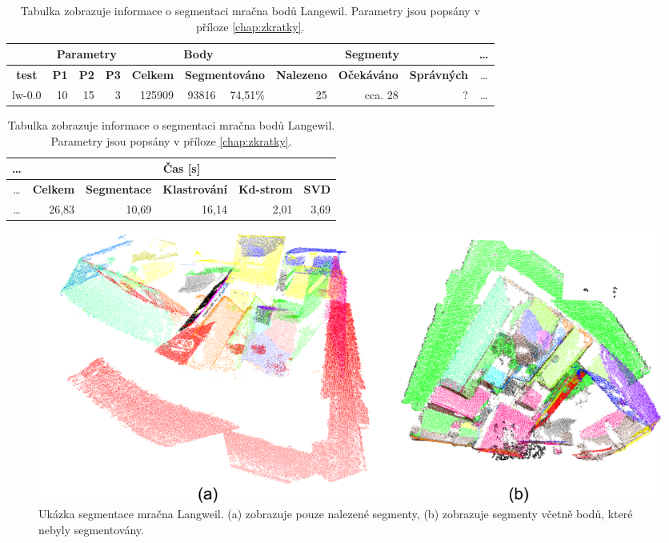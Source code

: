 \documentclass[11pt,twoside,a4paper]{book}
\begin{document}
\begin{table}[ht]
\resizebox{\textwidth}{!} {
\begin{tabular}{|r|r|r|r|r|r|r|r|r|r|c|}
\hline
\textbf{} & \multicolumn{ 3}{c|}{\textbf{Parametry}} & \multicolumn{ 3}{c|}{\textbf{Body}} & \multicolumn{ 3}{c|}{\textbf{Segmenty}} & \ldots\\ \hline
\multicolumn{1}{|c|}{\textbf{test}} & \textbf{P1} & \multicolumn{1}{c|}{\textbf{P2}} & \multicolumn{1}{c|}{\textbf{P3}} & \textbf{Celkem} & \multicolumn{ 2}{c|}{\textbf{Segmentováno}} & \textbf{Nalezeno} & \multicolumn{1}{c|}{\textbf{Očekáváno }} & \multicolumn{1}{c|}{\textbf{Správných}} & \ldots\\ \hline
lw-0.0 & \multicolumn{1}{r|}{10} & \multicolumn{1}{r|}{15} & \multicolumn{1}{r|}{3} & \multicolumn{1}{r|}{125909} & \multicolumn{1}{r|}{93816} & \multicolumn{1}{r|}{74,51\%} & \multicolumn{1}{r|}{25} & \multicolumn{1}{r|}{cca. 28} & \multicolumn{1}{r|}{?} & \ldots\\ \hline
\end{tabular}
}
\begin{flushright} \scalebox{0.9} {
\begin{tabular}{|c|r|r|r|r|r|}
\hline
\ldots& \multicolumn{ 5}{|c|}{\textbf{Čas [s]}} \\ \hline
\ldots& \textbf{Celkem} & \multicolumn{1}{c|}{\textbf{Segmentace}} & \multicolumn{1}{c|}{\textbf{Klastrování}} & \multicolumn{1}{c|}{\textbf{Kd-strom}} & \multicolumn{1}{c|}{\textbf{SVD}} \\ \hline
\ldots& \multicolumn{1}{|r|}{26,83} & \multicolumn{1}{r|}{10,69} & \multicolumn{1}{r|}{16,14} & \multicolumn{1}{r|}{2,01} & \multicolumn{1}{r|}{3,69} \\ \hline
\end{tabular}

}\end{flushright}

\caption{Tabulka zobrazuje informace o segmentaci mračna bodů Langewil. Parametry jsou popsány v příloze \ref{chap:zkratky}.} 
\label{table:test-lw}
\end{table}

\begin{figure}[ht]
\begin{center}
\includegraphics[width=\textwidth]{figures/test-lw}
\caption{Ukázka segmentace mračna Langweil. (a) zobrazuje pouze nalezené segmenty, (b) zobrazuje segmenty včetně bodů, které nebyly segmentovány.}
\label{fig:test-lw}
\end{center}
\end{figure}
\end{document}
